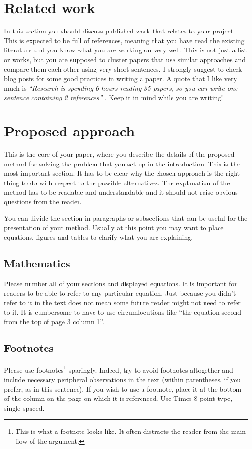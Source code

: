 \documentclass[10pt,twocolumn,letterpaper]{article}
\begin{document}
\section{Related work}
In this section you should discuss published work that relates to your project. This is expected to be full of references, meaning that you have read the existing literature and you know what you are working on very well. This is not just a list or works, but you are supposed to cluster papers that use similar approaches and compare them each other using very short sentences. I strongly suggest to check \cite{steinhardt, lipton} blog posts for some good practices in writing a paper. A quote that I like very much is \emph{``Research is spending 6 hours reading 35 papers, so you can write one sentence containing 2 references''} \cite{twit:ref}. Keep it in mind while you are writing!
\section{Proposed approach}
This is the core of your paper, where you describe the details of the proposed method for solving the problem that you set up in the introduction. This is the most important section. It has to be clear why the chosen approach is the right thing to do with respect to the possible alternatives. The explanation of the method has to be readable and understandable and it should not raise obvious questions from the reader. 

You can divide the section in paragraphs or subsections that can be useful for the presentation of your method. Usually at this point you may want to place equations, figures and tables to clarify what you are explaining.
\subsection{Mathematics}
Please number all of your sections and displayed equations.  It is
important for readers to be able to refer to any particular equation.  Just
because you didn't refer to it in the text does not mean some future reader
might not need to refer to it.  It is cumbersome to have to use
circumlocutions like ``the equation second from the top of page 3 column
1''. 
\subsection{Footnotes}
Please use footnotes\footnote {This is what a footnote looks like.  It
often distracts the reader from the main flow of the argument.} sparingly.
Indeed, try to avoid footnotes altogether and include necessary peripheral
observations in
the text (within parentheses, if you prefer, as in this sentence).  If you
wish to use a footnote, place it at the bottom of the column on the page on
which it is referenced. Use Times 8-point type, single-spaced.
\end{document}
